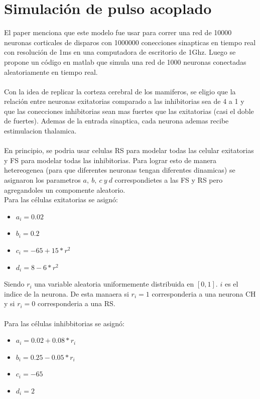 \documentclass[12pt]{article}
\begin{document}
\section{Simulación de pulso acoplado}
El paper menciona que este modelo fue usar para correr una red de 10000 neuronas corticales de disparos con 1000000 conecciones sinapticas en tiempo real con resolución de 1ms en una computadora de escritorio de 1Ghz.
Luego se propone un código en matlab que simula una red de 1000 neuronas conectadas aleatoriamente en tiempo real. \\ \\
Con la idea de replicar la corteza cerebral de los mamiferos, se eligio que la relación entre neuronas exitatorias comparado a las inhibitorias sea de 4 a 1 y que las conecciones inhibitorias sean mas fuertes que las exitatorias (casi el doble de fuertes).
Ademas de la entrada sinaptica, cada neurona ademas recibe estimulacion thalamica. \\ \\

En principio, se podria usar celulas RS para modelar todas las celular exitatorias y FS para modelar todas las inhibitorias. Para lograr esto de manera hetereogenea (para que diferentes neuronas tengan diferentes dinamicas)
se asignaron los parametros $a, \ b, \ c \ y \ d$ correspondietes a las FS y RS pero agregandoles un compomente aleatorio. \\
Para las células exitatorias se asignó:
\begin{itemize}
    \item $a_i = 0.02$
    \item $b_i = 0.2$
    \item $c_i = -65 + 15 * r^2$
    \item $d_i = 8 - 6 * r^2$
\end{itemize}

Siendo $r_i$ una variable aleatoria uniformemente distribuida en $[0,1 ]$. $i$ es el indice de la neurona. De esta manaera si $r_i = 1$ corresponderia a una neurona CH y si $r_i = 0$ corresponderia a una RS.\\
\\
Para las células inhibbitorias se asignó:
\begin{itemize}
    \item $a_i = 0.02 + 0.08 * r_i$
    \item $b_i = 0.25 - 0.05 * r_i$
    \item $c_i = -65$
    \item $d_i = 2$
\end{itemize}
\end{document}
